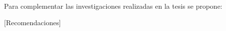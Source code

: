 \begin{recomendations}\label{chapter:Recomendations}

Para complementar las investigaciones realizadas en la tesis se propone:

[Recomendaciones]


\end{recomendations}
